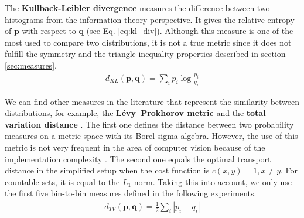 The \textbf{Kullback-Leibler divergence} \citep{Kullback.Leibler:IMS:1951}  measures the difference between two histograms from the information theory perspective. It gives the relative entropy of $\mathbf{p}$ with respect to $\mathbf{q}$ (see Eq. \eqref{eq:kl_div}). Although this measure is one of the most used to compare two distributions, it is not a true metric since it does not fulfill the symmetry and the triangle inequality properties described in section \ref{sec:measures}.
\begin{eqnarray}
d_{KL}(\mathbf{p}, \mathbf{q}) = \sum\nolimits_{i}p_i \log\frac{p_i}{q_i} \label{eq:kl_div}
\end{eqnarray}

We can find other measures in the literature that represent the similarity between distributions, for example, the \textbf{Lévy–Prokhorov metric} \citep{Prokhorov:TPA:1956} and the \textbf{total variation distance} \citep{Bogachev.Kolesnikov:RMS:2012}. The first one defines the distance between two probability measures on a metric space with its Borel sigma-algebra. However, the use of this metric is not very frequent in the area of computer vision because of the implementation complexity \citep{Bogachev.Kolesnikov:RMS:2012}. The second one equals the optimal transport distance \citep{Cuturi.Avis:JMLR:2011} in the simplified setup when the cost function is $c(x,y)=1, x\neq y$. For countable sets, it is equal to the $L_1$ norm. Taking this into account, we only use the first five bin-to-bin measures defined in the following experiments.
\begin{eqnarray}
d_{TV}(\mathbf{p}, \mathbf{q}) = \frac{1}{2}\sum\nolimits_{i}|p_i - q_i | \label{eq:tv_dist}
\end{eqnarray}


